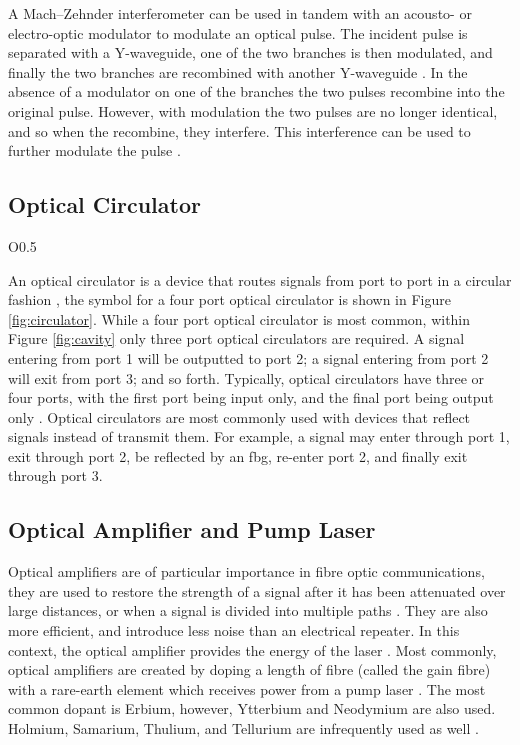 A Mach--Zehnder interferometer can be used in tandem with an acousto- or electro-optic modulator to modulate an optical pulse. The incident pulse is separated with a Y-waveguide, one of the two branches is then modulated, and finally the two branches are recombined with another Y-waveguide \cite{alazzawi, hausbook, karim}. In the absence of a modulator on one of the branches the two pulses recombine into the original pulse. However, with modulation the two pulses are no longer identical, and so when the recombine, they interfere. This interference can be used to further modulate the pulse \cite{agrawal2002, agrawal2013, hausbook, karim}. \\

\subsection{Optical Circulator}
\begin{wrapfigure}{O}{0.5\textwidth}
\centering

\caption{Symbol for a four port optical circulator.}
\label{fig:circulator}
\end{wrapfigure}
An optical circulator is a device that routes signals from port to port in a circular fashion \cite{agrawal2002, alazzawi, becker}, the symbol for a four port optical circulator is shown in Figure \ref{fig:circulator}. While a four port optical circulator is most common, within Figure \ref{fig:cavity} only three port optical circulators are required. A signal entering from port 1 will be outputted to port 2; a signal entering from port 2 will exit from port 3; and so forth. Typically, optical circulators have three or four ports, with the first port being input only, and the final port being output only \cite{alazzawi}. Optical circulators are most commonly used with devices that reflect signals instead of transmit them. For example, a signal may enter through port 1, exit through port 2, be reflected by an \gls{fbg}, re-enter port 2, and finally exit through port 3. \\

\subsection{Optical Amplifier and Pump Laser}
Optical amplifiers are of particular importance in fibre optic communications, they are used to restore the strength of a signal after it has been attenuated over large distances, or when a signal is divided into multiple paths \cite{alazzawi, starodoumov}. They are also more efficient, and introduce less noise than an electrical repeater. In this context, the optical amplifier provides the energy of the laser \cite{alazzawi}. Most commonly, optical amplifiers are created by doping a length of fibre (called the gain fibre) with a rare-earth element which receives power from a pump laser \cite{agrawal2002, alazzawi, starodoumov}. The most common dopant is Erbium, however, Ytterbium and Neodymium are also used. Holmium, Samarium, Thulium, and Tellurium are infrequently used as well \cite{agrawal2002}. \\

